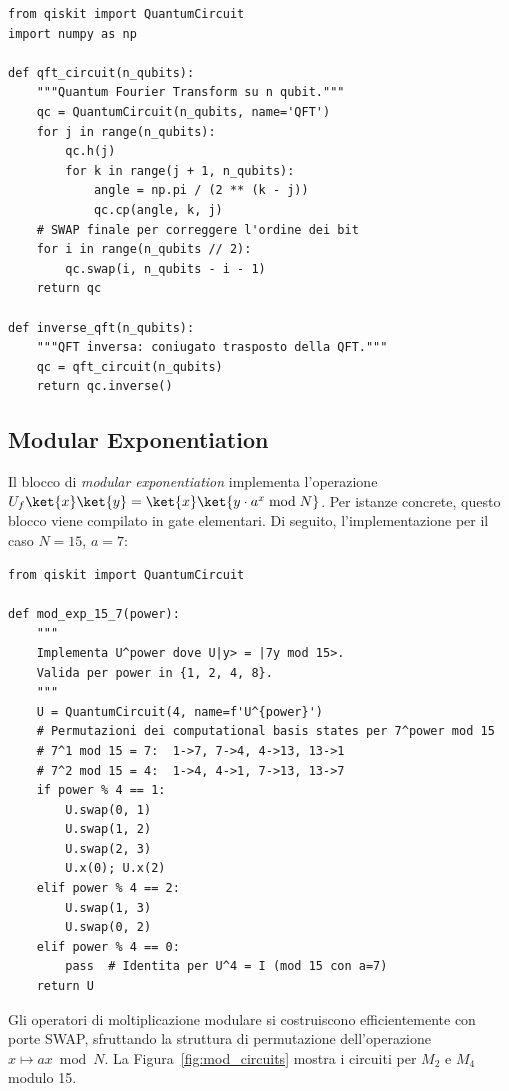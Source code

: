 \begin{onehalfspace}
\begin{lstlisting}[caption={Implementazione della Quantum Fourier Transform}]
from qiskit import QuantumCircuit
import numpy as np

def qft_circuit(n_qubits):
    """Quantum Fourier Transform su n qubit."""
    qc = QuantumCircuit(n_qubits, name='QFT')
    for j in range(n_qubits):
        qc.h(j)
        for k in range(j + 1, n_qubits):
            angle = np.pi / (2 ** (k - j))
            qc.cp(angle, k, j)
    # SWAP finale per correggere l'ordine dei bit
    for i in range(n_qubits // 2):
        qc.swap(i, n_qubits - i - 1)
    return qc

def inverse_qft(n_qubits):
    """QFT inversa: coniugato trasposto della QFT."""
    qc = qft_circuit(n_qubits)
    return qc.inverse()
\end{lstlisting}

\subsection{Modular Exponentiation}

Il blocco di \textit{modular exponentiation} implementa l'operazione $U_f\ket{x}\ket{y} = \ket{x}\ket{y \cdot a^x \bmod N}$. Per istanze concrete, questo blocco viene compilato in gate elementari. Di seguito, l'implementazione per il caso $N = 15$, $a = 7$:

\begin{lstlisting}[caption={Modular exponentiation per N=15, a=7}]
from qiskit import QuantumCircuit

def mod_exp_15_7(power):
    """
    Implementa U^power dove U|y> = |7y mod 15>.
    Valida per power in {1, 2, 4, 8}.
    """
    U = QuantumCircuit(4, name=f'U^{power}')
    # Permutazioni dei computational basis states per 7^power mod 15
    # 7^1 mod 15 = 7:  1->7, 7->4, 4->13, 13->1
    # 7^2 mod 15 = 4:  1->4, 4->1, 7->13, 13->7
    if power % 4 == 1:
        U.swap(0, 1)
        U.swap(1, 2)
        U.swap(2, 3)
        U.x(0); U.x(2)
    elif power % 4 == 2:
        U.swap(1, 3)
        U.swap(0, 2)
    elif power % 4 == 0:
        pass  # Identita per U^4 = I (mod 15 con a=7)
    return U
\end{lstlisting}

Gli operatori di moltiplicazione modulare si costruiscono efficientemente con porte SWAP, sfruttando la struttura di permutazione dell'operazione $x \mapsto ax \bmod N$. La Figura~\ref{fig:mod_circuits} mostra i circuiti per $M_2$ e $M_4$ modulo 15.


\end{onehalfspace}

